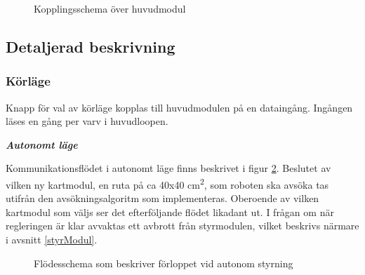 \documentclass[11pt]{article}
\begin{document}
\begin{flushleft}
\begin{figure}[htbp]
\centering
\noindent{}
	\caption{Kopplingsschema över huvudmodul \label{kopplingsschema:huvudmodul}}	
\end{figure}

\subsection{Detaljerad beskrivning}

\subsubsection {Körläge}
Knapp för val av körläge kopplas till huvudmodulen på en dataingång. Ingången läses en gång per varv i huvudloopen.

\textbf{\textit{Autonomt läge}}

Kommunikationsflödet i autonomt läge finns beskrivet i figur \ref{autonomousMode}. Beslutet av vilken ny kartmodul, en ruta på ca 40x40 cm\textsuperscript{2}, som roboten ska avsöka tas utifrån den avsökningsalgoritm som implementeras. Oberoende av vilken kartmodul som väljs ser det efterföljande flödet likadant ut. I frågan om när regleringen är klar avvaktas ett avbrott från styrmodulen, vilket beskrivs närmare i avsnitt \ref{styrModul}.

\begin{figure}[htbp]
\centering
\noindent\resizebox{0.9\linewidth}{!}{
	}
	\cprotect\caption{Flödesschema som beskriver förloppet vid autonom styrning \label{autonomousMode}}	
\end{figure}


\end{flushleft}
\end{document}
